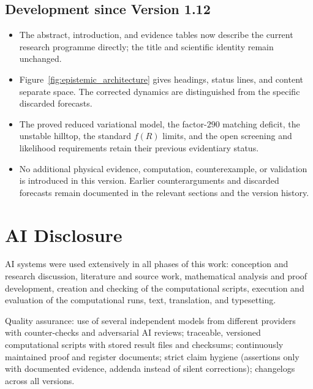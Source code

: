 \documentclass[12pt,a4paper]{article}
\theoremstyle{definition}
\theoremstyle{plain}
\theoremstyle{remark}
\begin{document}
\clearpage

\subsection*{Development since Version 1.12}
\begin{itemize}
\item The abstract, introduction, and evidence tables now describe the current
research programme directly; the title and scientific identity remain unchanged.
\item Figure~\ref{fig:epistemic_architecture} gives headings, status lines, and
content separate space. The corrected dynamics are distinguished from the
specific discarded forecasts.
\item The proved reduced variational model, the factor-\(290\) matching deficit,
the unstable hilltop, the standard \(f(R)\) limits, and the open screening and
likelihood requirements retain their previous evidentiary status.
\item No additional physical evidence, computation, counterexample, or validation
is introduced in this version. Earlier counterarguments and discarded forecasts
remain documented in the relevant sections and the version history.
\end{itemize}

\section*{AI Disclosure}

\noindent
AI systems were used extensively in all phases of this work: conception
and research discussion, literature and source work, mathematical analysis
and proof development, creation and checking of the computational scripts,
execution and evaluation of the computational runs, text, translation, and
typesetting.

\medskip

\noindent
Quality assurance: use of several independent models from different
providers with counter-checks and adversarial AI reviews; traceable,
versioned computational scripts with stored result files and checksums;
continuously maintained proof and register documents; strict claim hygiene
(assertions only with documented evidence, addenda instead of silent
corrections); changelogs across all versions.
\end{document}

